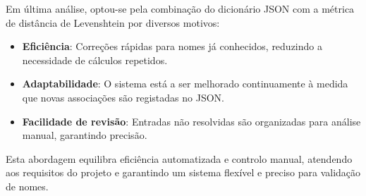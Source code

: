 \documentclass[a4paper,12pt]{article}
\begin{document}
Em última análise, optou-se pela combinação do dicionário JSON com a métrica de distância de Levenshtein por diversos motivos:  
\begin{itemize}
    \item \textbf{Eficiência}: Correções rápidas para nomes já conhecidos, reduzindo a necessidade de cálculos repetidos.
    \item \textbf{Adaptabilidade}: O sistema está a ser melhorado continuamente à medida que novas associações são registadas no JSON.
    \item \textbf{Facilidade de revisão}: Entradas não resolvidas são organizadas para análise manual, garantindo precisão.
\end{itemize}

Esta abordagem equilibra eficiência automatizada e controlo manual, atendendo aos requisitos do projeto e garantindo um sistema flexível e preciso para validação de nomes.


\end{document}
